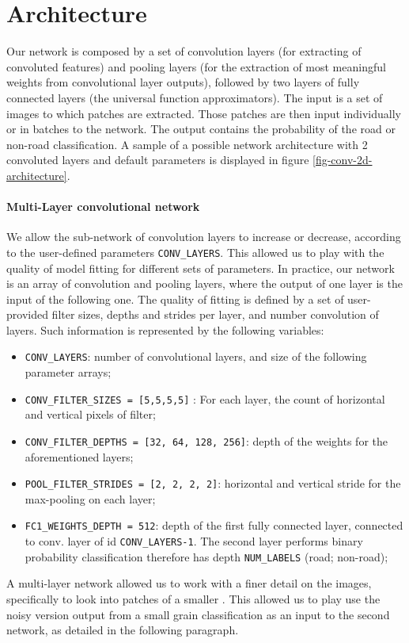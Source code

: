 \documentclass[fleqn,9 pt]{SelfArx} %
\begin{document}
\begin{sloppypar}
\section{Architecture}

Our network is composed by a set of convolution layers (for extracting of convoluted features) and pooling layers (for the extraction of most meaningful weights from convolutional layer outputs), followed by two layers of fully connected layers (the universal function approximators). The input is a set of images to which patches are extracted. Those patches are then input individually or in batches to the network. The output contains the probability of the road or non-road classification. A sample of a possible network architecture with 2 convoluted layers and default parameters is displayed in figure \ref{fig-conv-2d-architecture}.

\paragraph{Multi-Layer convolutional network}

We allow the sub-network of convolution layers to increase or decrease, according to the user-defined parameters \texttt{CONV\_LAYERS}. This allowed us to play with the quality of model fitting for different sets of parameters. In practice, our network is an array of convolution and pooling layers, where the output of one layer is the input of the following one. The quality of fitting is defined by a set of user-provided filter sizes, depths and strides per layer, and number convolution of layers. Such information is represented by the following variables:
\begin{itemize}
\item \texttt{CONV\_LAYERS}: number of convolutional layers, and size of the following parameter arrays;
\item \texttt{CONV\_FILTER\_SIZES = [5,5,5,5]} : For each layer, the count of horizontal and vertical pixels of filter;
\item \texttt{CONV\_FILTER\_DEPTHS = [32, 64, 128, 256]}: depth of the weights for the aforementioned layers;
\item \texttt{POOL\_FILTER\_STRIDES = [2, 2, 2, 2]}: horizontal and vertical stride for the max-pooling on each layer;
\item \texttt{FC1\_WEIGHTS\_DEPTH = 512}: depth of the first fully connected layer, connected to conv. layer of id \texttt{CONV\_LAYERS-1}. The second layer performs binary probability classification therefore has depth \texttt{NUM\_LABELS} (road; non-road);
\end{itemize}
  A multi-layer network allowed us to work with a finer detail on the images, specifically to look into patches of a smaller . This allowed us to play use the noisy version output from a small grain classification as an input to the second network, as detailed in the following paragraph.


\end{sloppypar}
\end{document}
